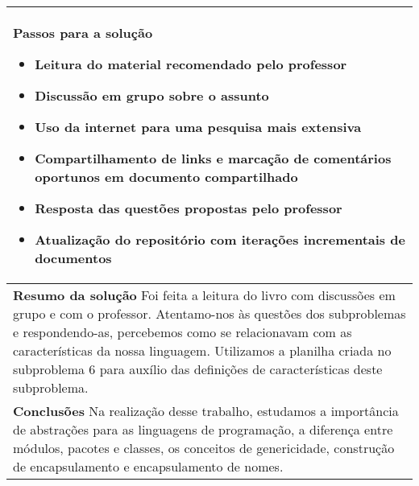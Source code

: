 \documentclass[12pt, a4paper]{article}
\begin{document}
\begin{longtabu}{| X |}
    \textbf{Passos para a solução} \newline
    \begin{minipage}[t]{\linewidth}
    \begin{itemize}[itemsep=.5ex,parsep=.0ex,after=\strut,leftmargin=15pt]
        \item
        Leitura do material recomendado pelo professor
        \item
        Discussão em grupo sobre o assunto
        \item
        Uso da internet para uma pesquisa mais extensiva
        \item
        Compartilhamento de links e marcação de comentários oportunos em
        documento compartilhado
        \item
        Resposta das questões propostas pelo professor
        \item
        Atualização do repositório com iterações incrementais de documentos
    \end{itemize}
    \end{minipage}
    \\ \hline

    \textbf{Resumo da solução} \newline
    Foi feita a leitura do livro com discussões em grupo e com o professor.
    Atentamo-nos às questões dos subproblemas e respondendo-as, percebemos como
    se relacionavam com as características da nossa linguagem. Utilizamos a
    planilha criada no subproblema 6 para auxílio das definições de
    características deste subproblema.
    \\ \hline

    \textbf{Conclusões} \newline
    Na realização desse trabalho, estudamos a importância de abstrações para as
    linguagens de programação, a diferença entre módulos, pacotes e classes, os
    conceitos de genericidade, construção de encapsulamento e encapsulamento de
    nomes.
    \\ \hline

\end{longtabu}
\end{document}
